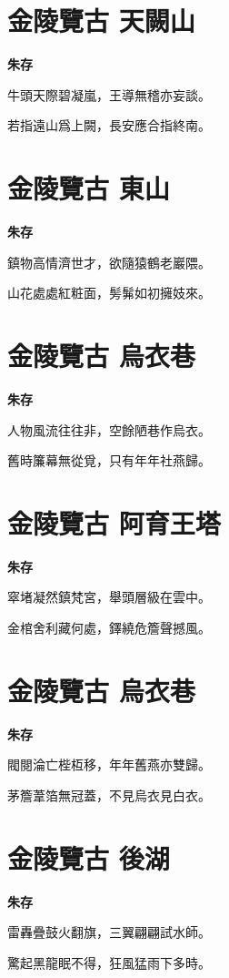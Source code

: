 \documentclass[12pt,a4paper]{ctexbook}
\begin{document}
\section{金陵覽古 天闕山}
\textbf{朱存}\par\vspace{0.5em}
牛頭天際碧凝嵐，王導無稽亦妄談。\par
若指遠山爲上闕，長安應合指終南。\par

\section{金陵覽古 東山}
\textbf{朱存}\par\vspace{0.5em}
鎮物高情濟世才，欲隨猿鶴老巖隈。\par
山花處處紅粧面，髣髴如初擁妓來。\par

\section{金陵覽古 烏衣巷}
\textbf{朱存}\par\vspace{0.5em}
人物風流往往非，空餘陋巷作烏衣。\par
舊時簾幕無從覓，只有年年社燕歸。\par

\section{金陵覽古 阿育王塔}
\textbf{朱存}\par\vspace{0.5em}
窣堵凝然鎮梵宮，舉頭層級在雲中。\par
金棺舍利藏何處，鐸繞危簷聲撼風。\par

\section{金陵覽古 烏衣巷}
\textbf{朱存}\par\vspace{0.5em}
閥閱淪亡梐枑移，年年舊燕亦雙歸。\par
茅簷葦箔無冠蓋，不見烏衣見白衣。\par

\section{金陵覽古 後湖}
\textbf{朱存}\par\vspace{0.5em}
雷轟疊鼓火翻旗，三翼翩翩試水師。\par
驚起黑龍眠不得，狂風猛雨下多時。\par
\end{document}
